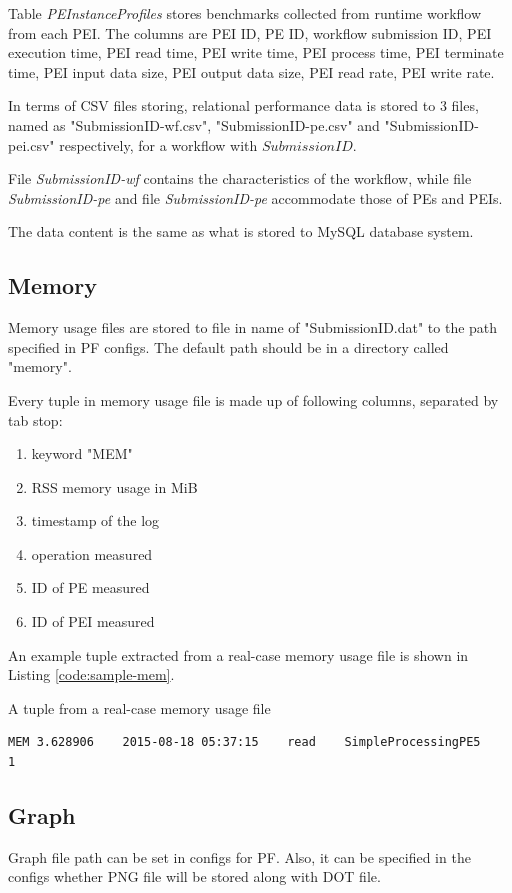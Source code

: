 \documentclass[10pt,twoside,openright,logo]{report}
\begin{document}
Table \textit{PEInstanceProfiles} stores benchmarks collected from runtime  workflow from each PEI. The columns are PEI ID, PE ID, workflow submission ID, PEI execution time, PEI read time, PEI write time, PEI process time, PEI terminate time, PEI input data size, PEI output data size, PEI read rate, PEI write rate.

In terms of CSV files storing, relational performance data is stored to 3 files, named as "SubmissionID-wf.csv", "SubmissionID-pe.csv" and "SubmissionID-pei.csv" respectively, for a workflow with $SubmissionID$.

File \textit{SubmissionID-wf} contains the characteristics of the workflow, while file \textit{SubmissionID-pe} and file \textit{SubmissionID-pe} accommodate those of PEs and PEIs.

The data content is the same as what is stored to MySQL database system.

\subsection{Memory}
Memory usage files are stored to file in name of "SubmissionID.dat" to the path specified in PF configs. The default path should be in a directory called "memory".

Every tuple in memory usage file is made up of following columns, separated by tab stop:
\begin{enumerate}
    \item keyword "MEM"
    \item RSS memory usage in MiB
    \item timestamp of the log
    \item operation measured
    \item ID of PE measured
    \item ID of PEI measured
\end{enumerate}

An example tuple extracted from a real-case memory usage file is shown in Listing \ref{code:sample-mem}.
\begin{listing}
\caption{A tuple from a real-case memory usage file}
\label{code:sample-mem}
\begin{verbatim}
MEM 3.628906    2015-08-18 05:37:15    read    SimpleProcessingPE5    1
\end{verbatim}
\end{listing}

\subsection{Graph}
Graph file path can be set in configs for PF. Also, it can be specified in the configs whether PNG file will be stored along with DOT file.
\end{document}
